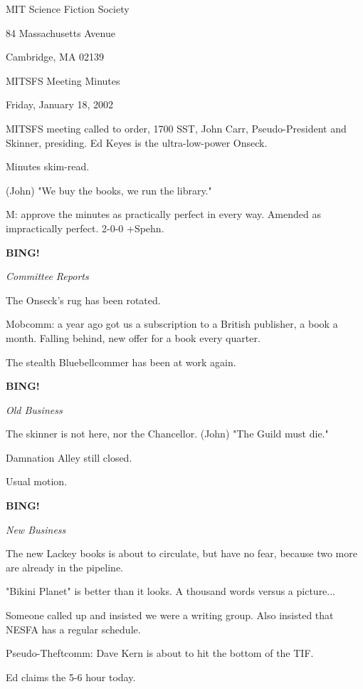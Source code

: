 \documentclass[12pt]{article}
\newcommand{\bing}{{\bf BING!} }
\newcommand{\goto}[1]{\bing \vskip 12pt \centerline{{\em{#1}}}}
\begin{document}
\begin{center}

MIT Science Fiction Society 

84 Massachusetts Avenue

Cambridge, MA 02139

\vspace{12pt}

MITSFS Meeting Minutes 

Friday, January 18, 2002

\end{center}
 
\vspace{18pt}

\setlength{\parskip}{6pt}

\noindent
MITSFS meeting called to order, 1700 SST, John Carr, Pseudo-President and Skinner, presiding.  Ed Keyes is the ultra-low-power Onseck.

Minutes skim-read.

(John) "We buy the books, we run the library."

M: approve the minutes as practically perfect in every way. Amended as impractically perfect. 2-0-0 +Spehn.

\goto{Committee Reports}

The Onseck's rug has been rotated.

Mobcomm: a year ago got us a subscription to a British publisher, a book a month. Falling behind, new offer for a book every quarter.

The stealth Bluebellcommer has been at work again.

\goto{Old Business}

The skinner is not here, nor the Chancellor. (John) "The Guild must die."

Damnation Alley still closed.

Usual motion.

\goto{New Business}

The new Lackey books is about to circulate, but have no fear, because two more are already in the pipeline.

"Bikini Planet" is better than it looks. A thousand words versus a picture...

Someone called up and insisted we were a writing group. Also insisted that NESFA has a regular schedule.

Pseudo-Theftcomm: Dave Kern is about to hit the bottom of the TIF.

Ed claims the 5-6 hour today.
\end{document}
